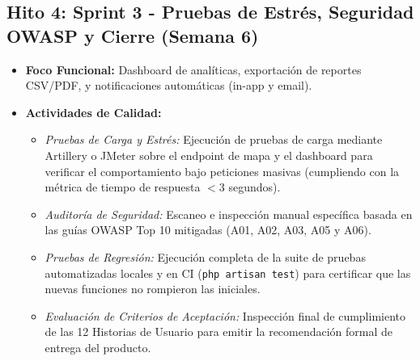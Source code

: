 \subsection*{Hito 4: Sprint 3 - Pruebas de Estrés, Seguridad OWASP y Cierre (Semana 6)}
\begin{itemize}
    \item \textbf{Foco Funcional:} Dashboard de analíticas, exportación de reportes CSV/PDF, y notificaciones automáticas (in-app y email).
    \item \textbf{Actividades de Calidad:}
    \begin{itemize}
        \item \textit{Pruebas de Carga y Estrés:} Ejecución de pruebas de carga mediante Artillery o JMeter sobre el endpoint de mapa y el dashboard para verificar el comportamiento bajo peticiones masivas (cumpliendo con la métrica de tiempo de respuesta $< 3$ segundos).
        \item \textit{Auditoría de Seguridad:} Escaneo e inspección manual específica basada en las guías OWASP Top 10 mitigadas (A01, A02, A03, A05 y A06).
        \item \textit{Pruebas de Regresión:} Ejecución completa de la suite de pruebas automatizadas locales y en CI (\texttt{php artisan test}) para certificar que las nuevas funciones no rompieron las iniciales.
        \item \textit{Evaluación de Criterios de Aceptación:} Inspección final de cumplimiento de las 12 Historias de Usuario para emitir la recomendación formal de entrega del producto.
    \end{itemize}
\end{itemize}
